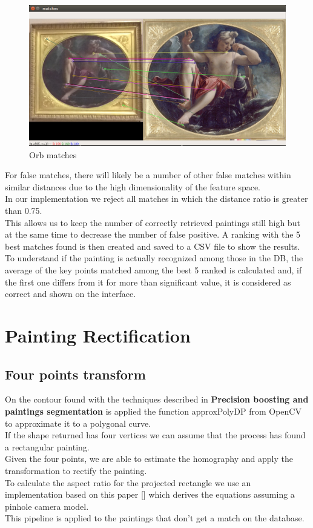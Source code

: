 \documentclass[conference]{IEEEtran}
\begin{document}
\begin{figure}[htbp]
\centerline{\includegraphics[width=0.8\columnwidth]{../Orb_matches/match3.png}}
\caption{Orb matches}
\label{fig_Orb_matches}
\end{figure}
\bigskip

For false matches, there will likely be a number of other false matches within similar distances due to the high dimensionality of the feature space.\\
In our implementation we reject all matches in which the distance ratio is greater than 0.75.\\
This allows us to keep the number of correctly retrieved paintings still high but at the same time to decrease the number of false positive.
A ranking with the 5 best matches found is then created and saved to a CSV file to show the results.\\
To understand if the painting is actually recognized among those in the DB, the average of the key points matched among the best 5 ranked is calculated and, if the first one differs from it for more than significant value, it is considered as correct and shown on the interface.


\section{Painting Rectification}
\subsection{Four points transform}
On the contour found with the techniques described in \textbf{Precision boosting and paintings segmentation} is applied the function approxPolyDP from OpenCV to approximate it to a polygonal curve.\\
If the shape returned has four vertices we can assume that the process has found a rectangular painting.\\
Given the four points, we are able to estimate the homography and apply the transformation to rectify the painting.\\
To calculate the aspect ratio for the projected rectangle we use an implementation based on this paper [] which derives the equations assuming a pinhole camera model.\\
This pipeline is applied to the paintings that don't get a match on the database.
\end{document}
